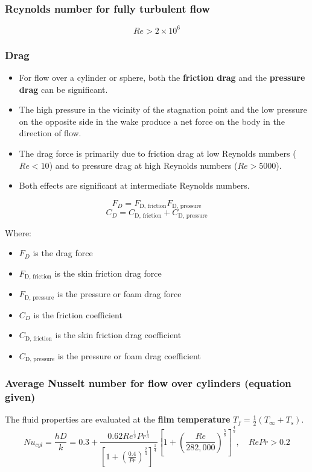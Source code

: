\documentclass[11pt]{article}
\begin{document}
\subsubsection{Reynolds number for fully turbulent flow}
\label{sec:org4ea1d3b}
\[Re > 2 \times 10^6\]
\subsubsection{Drag}
\label{sec:org1ab8757}
\begin{itemize}
\item For flow over a cylinder or sphere, both the \textbf{friction drag} and the \textbf{pressure drag} can be significant.
\item The high pressure in the vicinity of the stagnation point and the low pressure on the opposite side in the wake produce a net force on the body in the direction of flow.
\item The drag force is primarily due to friction drag at low Reynolds numbers (\(Re < 10\)) and to pressure drag at high Reynolds numbers (\(Re > 5000\)).
\item Both effects are significant at intermediate Reynolds numbers.
\end{itemize}

\[F_D = F_{\text{D, friction}} F_{\text{D, pressure}}\]
\[C_D = C_{\text{D, friction}} + C_{\text{D, pressure}}\]

Where:
\begin{itemize}
\item \(F_D\) is the drag force
\item \(F_{\text{D, friction}}\) is the skin friction drag force
\item \(F_{\text{D, pressure}}\) is the pressure or foam drag force
\item \(C_D\) is the friction coefficient
\item \(C_{\text{D, friction}}\) is the skin friction drag coefficient
\item \(C_{\text{D, pressure}}\) is the pressure or foam drag coefficient
\end{itemize}

 \newpage
\subsubsection{Average Nusselt number for flow over cylinders (equation given)}
\label{sec:org81cf1e5}
The fluid properties are evaluated at the \textbf{film temperature} \(T_f = \frac{1}{2} (T_{\infty} + T_s)\).
\[Nu_{cyl} = \frac{hD}{k} = 0.3 + \frac{0.62 Re^{\frac{1}{2}} Pr^{\frac{1}{3}}}{\left[1 + \left(\frac{0.4}{Pr} \right)^{\frac{2}{3}} \right]^{\frac{1}{4}}} \left[1 + \left(\frac{Re}{282,000} \right)^{\frac{5}{8}} \right]^{\frac{4}{5}}, \quad RePr > 0.2\]
\end{document}
